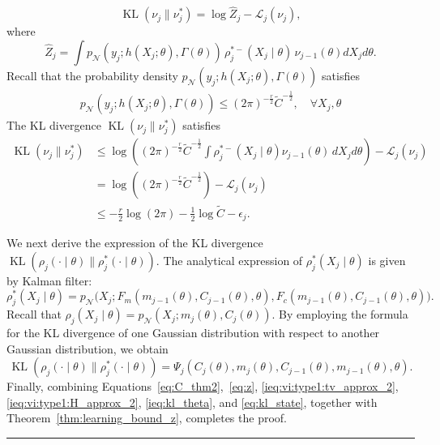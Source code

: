 \documentclass[preprint,3p,times]{elsarticle}
\DeclareMathOperator{\KL}{KL}
\newcommand{\pdense}{p}
\newcommand{\BlackBox}{\rule{1.5ex}{1.5ex}}  %
\renewenvironment{proof}{\par\noindent{\bf Proof\ }}{\hfill\BlackBox\\[2mm]}
\newenvironment{proof}{\par\noindent{\bf Proof\ }}{\hfill\BlackBox\\[2mm]}
\begin{document}
\begin{proof}
\begin{equation*}
\KL\left(\nu_j \lVert \nu_j^*\right) = \log \hat{Z}_j - \mathcal{L}_j(\nu_j),
\end{equation*}
where 
\begin{equation*}
\hat{Z}_j =  \int \pdense_\mathcal{N}(y_j; h(X_j;\theta), \Gamma(\theta))\, \rho_j^{*-}(X_j \mid \theta)\,\nu_{j-1}(\theta)dX_jd\theta.
\end{equation*}
Recall that the probability density $\pdense_\mathcal{N}(y_j; h(X_j;\theta), \Gamma(\theta))$
satisfies
\begin{align*}
\pdense_\mathcal{N}(y_j; h(X_j;\theta), \Gamma(\theta)) \leq (2\pi)^{-\frac{r}{2}}\tilde{C}^{-\frac{1}{2}}, \quad \forall X_j, \theta
\end{align*}
The KL divergence $\KL\left(\nu_j \lVert \nu_j^*\right)$ satisfies
\begin{align}
\KL(\nu_j  \| \nu_j^*) 
&\leq \log \left((2\pi)^{-\frac{r}{2}}\tilde{C}^{-\frac{1}{2}}\int \rho_j^{*-}(X_j \mid \theta)\nu_{j-1}(\theta) \, dX_jd\theta \right) - \mathcal{L}_j(\nu_j) \nonumber \\
& =\log \left((2\pi)^{-\frac{r}{2}}\tilde{C}^{-\frac{1}{2}}\right) - \mathcal{L}_j(\nu_j) \nonumber \\
& \leq -\frac{r}{2}\log(2\pi) - \frac{1}{2}\log \tilde{C} - \epsilon_j.
\label{ieq:kl_theta}
\end{align}

We next derive the expression of the KL divergence $\KL\left(\rho_j(\cdot \mid \theta) \lVert \rho_j^*(\cdot \mid \theta) \right)$.
The analytical expression of $\rho_j^*(X_j \mid \theta)$ is given by Kalman filter:
\begin{equation}
\rho_j^*(X_j \mid \theta) = \pdense_{\mathcal{N}}\bigg (X_j; F_m(m_{j-1}(\theta), C_{j-1}(\theta),\theta), F_c(m_{j-1}(\theta), C_{j-1}(\theta),\theta)\bigg).
\end{equation}
Recall that $\rho_j(X_j \mid \theta) = \pdense_{\mathcal{N}}(X_j; m_j(\theta), C_j(\theta))$. By employing the formula for the KL divergence of one Gaussian distribution with respect to another Gaussian distribution, we obtain
\begin{equation}
\KL\left(\rho_j(\cdot \mid \theta) \lVert \rho_j^*(\cdot \mid \theta) \right) = \Psi_j(C_j(\theta), m_j(\theta), C_{j-1}(\theta), m_{j-1}(\theta), \theta). 
\label{eq:kl_state}
\end{equation}
Finally, combining Equations~\eqref{eq:C_thm2},~\eqref{eq:z}, \eqref{ieq:vi:type1:tv_approx_2}, \eqref{ieq:vi:type1:H_approx_2}, \eqref{ieq:kl_theta}, and \eqref{eq:kl_state}, together with Theorem~\ref{thm:learning_bound_z}, completes the proof.
\end{proof}
\end{document}
